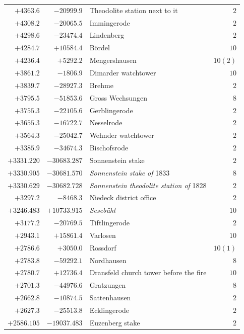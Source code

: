 \begin{center}
\begin{tabular}{r|r|p{170pt}|r}
\(+4363.6\)&\(-20999.9\)&Theodolite station next to it&\(2\)\\
\(+4308.2\)&\(-20065.5\)&Immingerode&\(2\)\\
\(+4298.6\)&\(-23474.4\)&Lindenberg&\(2\)\\
\(+4284.7\)&\(+10584.4\)&Bördel&\(10\)\\
\(+4236.4\)&\(+5292.2\)&Mengershausen&\(10(2)\)\\
\(+3861.2\)&\(-1806.9\)&Dimarder watchtower&\(10\)\\
\(+3839.7\)&\(-28927.3\)&Brehme&\(2\)\\
\(+3795.5\)&\(-51853.6\)&Gross Wechsungen&\(8\)\\
\(+3755.3\)&\(-22105.6\)&Gerblingerode&\(2\)\\
\(+3655.3\)&\(-16722.7\)&Nesselrode&\(2\)\\
\(+3564.3\)&\(-25042.7\)&Wehnder watchtower&\(2\)\\
\(+3385.9\)&\(-34674.3\)&Bischofsrode&\(2\)\\
\(+3331.220\)&\(-30683.287\)&Sonnenstein stake&\(2\)\\
\(+3330.905\)&\(-30681.570\)&\textit{Sonnenstein stake of} 1833&\(8\)\\
\(+3330.629\)&\(-30682.728\)&\textit{Sonnenstein theodolite station of} 1828&\(2\)\\
\(+3297.2\)&\(-8468.3\)&Niedeck district office&\(2\)\\
\(+3246.483\)&\(+10733.915\)&\textit{Sesebühl}&\(10\)\\
\(+3177.2\)&\(-20769.5\)&Tiftlingerode&\(2\)\\
\(+2943.1\)&\(+15861.4\)&Varlosen&\(10\)\\
\(+2786.6\)&\(+3050.0\)&Rossdorf&\(10(1)\)\\
\(+2783.8\)&\(-59292.1\)&Nordhausen&\(8\)\\
\(+2780.7\)&\(+12736.4\)&Dransfeld church tower before the fire&\(10\)\\
\(+2701.3\)&\(-44976.6\)&Gratzungen&\(8\)\\
\(+2662.8\)&\(-10874.5\)&Sattenhausen&\(2\)\\
\(+2627.3\)&\(-25513.8\)&Ecklingerode&\(2\)\\
\(+2586.105\)&\(-19037.483\)&Euzenberg stake&\(2\)\\
\hline\end{tabular}\endgroup\end{center}
\clearpage
